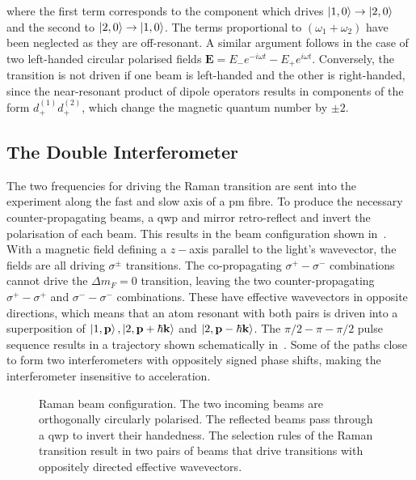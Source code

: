 where the first term corresponds to the component which drives
$\ket{1,0} \rightarrow \ket{2,0}$ and the second to $\ket{2,0}
\rightarrow \ket{1,0}$.
The terms proportional
to $(\omega_1 + \omega_2)$ have been neglected as they are
off-resonant. A similar argument follows in the case of two left-handed
circular polarised fields $\textbf{E} = E_- e^{-i \omega t} - E_+
e^{i \omega t}$. Conversely, the transition is not driven if one beam
is left-handed and the other is right-handed, since the near-resonant product of dipole operators
results in components of the form $d^{(1)}_+ d^{(2)}_+$, which
change the magnetic quantum number by $\pm2$.
\subsection{The Double Interferometer}\label{sec:theory_double_int}
The two frequencies for driving the Raman transition are sent into the
experiment along the fast and slow axis of a \ac{pm} fibre. 
To produce the necessary counter-propagating beams, a \ac{qwp} and
mirror retro-reflect and invert the polarisation of each beam. This
results in the beam configuration shown in~.
With a magnetic field defining a $z-$axis parallel to the light's
wavevector, the fields are all driving $\sigma^\pm$ transitions. The
co-propagating $\sigma^+ - \sigma^-$ combinations cannot drive the
$\Delta m_F = 0$  transition, leaving the two
counter-propagating $\sigma^{+} - \sigma^{+}$ and $\sigma^{-} -
\sigma^{-}$ combinations. These have effective wavevectors in opposite
directions, which means that an atom resonant with both pairs is
driven into a superposition of $\ket{1,\textbf{p}},
  \ket{2,\textbf{p}+\hbar \textbf{k}}$ and  $\ket{2,\textbf{p}-\hbar
  \textbf{k}}$. The $\pi/2-\pi-\pi/2$ pulse sequence results in a trajectory shown schematically
  in~. Some of the paths close to
  form two interferometers with oppositely signed phase shifts, making
  the interferometer insensitive to acceleration.
\begin{figure}[htpb]
  \centering
  \resizebox{0.8\textwidth}{!}{}
  \caption[Raman beam configuration.]{Raman beam configuration. The two incoming beams are
  orthogonally circularly polarised. The reflected beams pass through
a \ac{qwp} to invert their handedness. The selection rules of the
Raman transition result in two pairs of beams that drive transitions
with oppositely directed effective wavevectors.}
  \label{fig:double_int}
\end{figure}
